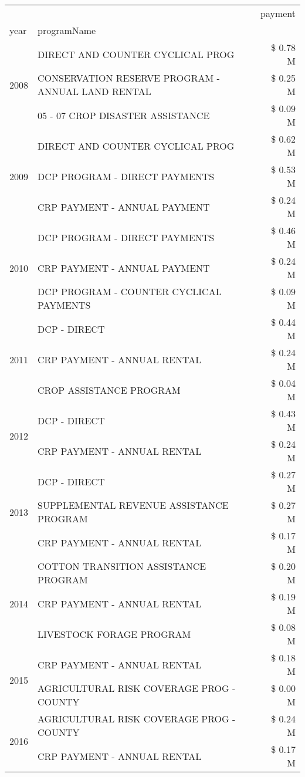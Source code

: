\begin{tabular}{llr}
\toprule
 &  & payment \\
year & programName &  \\
\midrule
\multirow[t]{3}{*}{2008} & DIRECT AND COUNTER CYCLICAL PROG & \$ 0.78 M \\
 & CONSERVATION RESERVE PROGRAM - ANNUAL LAND RENTAL & \$ 0.25 M \\
 & 05 - 07 CROP DISASTER ASSISTANCE & \$ 0.09 M \\
\cline{1-3}
\multirow[t]{3}{*}{2009} & DIRECT AND COUNTER CYCLICAL PROG & \$ 0.62 M \\
 & DCP PROGRAM - DIRECT PAYMENTS & \$ 0.53 M \\
 & CRP PAYMENT - ANNUAL PAYMENT & \$ 0.24 M \\
\cline{1-3}
\multirow[t]{3}{*}{2010} & DCP PROGRAM - DIRECT PAYMENTS & \$ 0.46 M \\
 & CRP PAYMENT - ANNUAL PAYMENT & \$ 0.24 M \\
 & DCP PROGRAM - COUNTER CYCLICAL PAYMENTS & \$ 0.09 M \\
\cline{1-3}
\multirow[t]{3}{*}{2011} & DCP - DIRECT & \$ 0.44 M \\
 & CRP PAYMENT - ANNUAL RENTAL & \$ 0.24 M \\
 & CROP ASSISTANCE PROGRAM & \$ 0.04 M \\
\cline{1-3}
\multirow[t]{2}{*}{2012} & DCP - DIRECT & \$ 0.43 M \\
 & CRP PAYMENT - ANNUAL RENTAL & \$ 0.24 M \\
\cline{1-3}
\multirow[t]{3}{*}{2013} & DCP - DIRECT & \$ 0.27 M \\
 & SUPPLEMENTAL REVENUE ASSISTANCE PROGRAM & \$ 0.27 M \\
 & CRP PAYMENT - ANNUAL RENTAL & \$ 0.17 M \\
\cline{1-3}
\multirow[t]{3}{*}{2014} & COTTON TRANSITION ASSISTANCE PROGRAM & \$ 0.20 M \\
 & CRP PAYMENT - ANNUAL RENTAL & \$ 0.19 M \\
 & LIVESTOCK FORAGE PROGRAM & \$ 0.08 M \\
\cline{1-3}
\multirow[t]{2}{*}{2015} & CRP PAYMENT - ANNUAL RENTAL & \$ 0.18 M \\
 & AGRICULTURAL RISK COVERAGE PROG - COUNTY & \$ 0.00 M \\
\cline{1-3}
\multirow[t]{3}{*}{2016} & AGRICULTURAL RISK COVERAGE PROG - COUNTY & \$ 0.24 M \\
 & CRP PAYMENT - ANNUAL RENTAL & \$ 0.17 M \\

\end{tabular}
